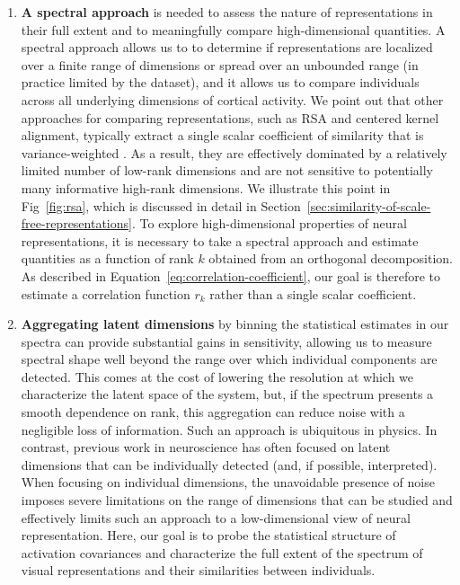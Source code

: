 \documentclass[10pt]{article}
\providecommand{\tightlist}{\setlength{\itemsep}{0pt}\setlength{\parskip}{0pt}}
\begin{document}
\begin{enumerate}
\def\labelenumi{\arabic{enumi}.}
\tightlist
\item
  \textbf{A spectral approach} is needed to assess the nature of representations in their full extent and to meaningfully compare high-dimensional quantities. A spectral approach allows us to to determine if representations are localized over a finite range of dimensions or spread over an unbounded range (in practice limited by the dataset), and it allows us to compare individuals across all underlying dimensions of cortical activity. We point out that other approaches for comparing representations, such as RSA and centered kernel alignment, typically extract a single scalar coefficient of similarity that is variance-weighted \autocite{Kriegeskorte2008,Kornblith2019}. As a result, they are effectively dominated by a relatively limited number of low-rank dimensions and are not sensitive to potentially many informative high-rank dimensions. We illustrate this point in Fig~\ref{fig:rsa}, which is discussed in detail in Section~\ref{sec:similarity-of-scale-free-representations}. To explore high-dimensional properties of neural representations, it is necessary to take a spectral approach and estimate quantities as a function of rank \(k\) obtained from an orthogonal decomposition. As described in Equation~\ref{eq:correlation-coefficient}, our goal is therefore to estimate a correlation function \(r_k\) rather than a single scalar coefficient.
\item
  \textbf{Aggregating latent dimensions} by binning the statistical estimates in our spectra can provide substantial gains in sensitivity, allowing us to measure spectral shape well beyond the range over which individual components are detected. This comes at the cost of lowering the resolution at which we characterize the latent space of the system, but, if the spectrum presents a smooth dependence on rank, this aggregation can reduce noise with a negligible loss of information. Such an approach is ubiquitous in physics. In contrast, previous work in neuroscience has often focused on latent dimensions that can be individually detected (and, if possible, interpreted). When focusing on individual dimensions, the unavoidable presence of noise imposes severe limitations on the range of dimensions that can be studied and effectively limits such an approach to a low-dimensional view of neural representation. Here, our goal is to probe the statistical structure of activation covariances and characterize the full extent of the spectrum of visual representations and their similarities between individuals.
\end{enumerate}
\end{document}
